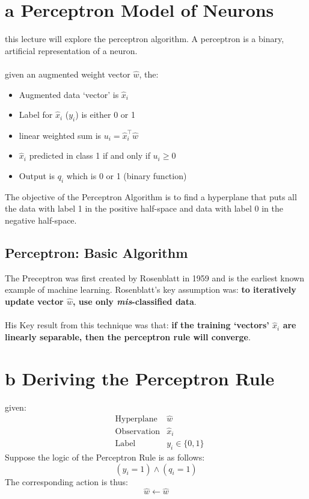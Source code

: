 \documentclass[12pt]{book}
\title{\coursetitle\linebreak\lecturename}
\author{\\Cain Susko\\ 
           \\ \\ \\
      Queen's University 
    \\School of Computing\\}
\begin{document}
\begin{titlepage}
        \maketitle
\end{titlepage}


\section*{a Perceptron Model of Neurons}
this lecture will explore the perceptron algorithm. A perceptron is a binary,
artificial representation of a neuron.
\paragraph*{}
given an augmented weight vector $\hat w$, the:
\begin{itemize}
        \item Augmented data `vector' is $\hat x_i$
        \item Label for $\hat x_i$ ($y_i$) is either 0 or 1
        \item linear weighted sum is $u_i = \hat x_i^\top \hat w$
        \item $\hat x_i$ predicted in class 1 if and only if $u_i \geq 0$
        \item Output is $q_i$ which is 0 or 1 (binary function)
\end{itemize}

The objective of the Perceptron Algorithm is to find a hyperplane that
puts all the data with label 1 in the positive half-space and data with
label 0 in the negative half-space.

\subsection*{Perceptron: Basic Algorithm}
The Preceptron was first created by Rosenblatt in 1959 and is the earliest
known example of machine learning. Rosenblatt's key assumption was: \textbf{to
iteratively update vector $\hat w$, use only \textit{mis}-classified data}.
\paragraph*{}
His Key result from this technique was that: \textbf{if the training `vectors'
$\hat x_i$ are linearly separable, then the perceptron rule will converge}.

\section*{b Deriving the Perceptron Rule}
given:
\begin{align*}
        &\text{Hyperplane} &\hat w\\
        &\text{Observation} &\hat x_i\\
        &\text{Label} &y_i \in \{0,1\}
\end{align*}
Suppose the logic of the Perceptron Rule is as follows:
\[(y_i = 1) \wedge (q_i = 1)\]
The corresponding action is thus:
\[\hat w \leftarrow \hat w\]
\end{document}

